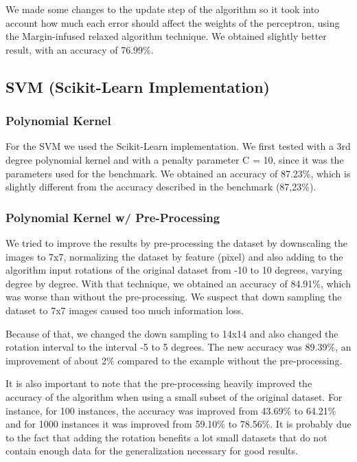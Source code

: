\documentclass[twoside,twocolumn]{article}
\begin{document}
We made some changes to the update step of the algorithm so it took into account how much
each error should affect the weights of the perceptron, using the Margin-infused relaxed algorithm
technique. We obtained slightly better result, with an accuracy of 76.99\%.

\subsection{SVM (Scikit-Learn Implementation)}

\subsubsection{Polynomial Kernel}

For the SVM we used the Scikit-Learn implementation. We first tested with a 3rd degree polynomial kernel and with a penalty parameter C = 10, since
it was the parameters used for the benchmark. We obtained an accuracy of 87.23\%, which is slightly different from the accuracy described in the benchmark (87,23\%).

\subsubsection{Polynomial Kernel w/ Pre-Processing}

We tried to improve the results by pre-processing the dataset by downscaling the images to 7x7, normalizing the dataset by feature (pixel) and also adding
to the algorithm input rotations of the original dataset from -10 to 10 degrees, varying degree by degree.
With that technique, we obtained an accuracy of 84.91\%, which was worse than without the pre-processing. We suspect that down sampling the dataset
to 7x7 images caused too much information loss.

Because of that, we changed the down sampling to 14x14 and also changed the rotation interval to the interval -5 to 5 degrees.
The new accuracy was 89.39\%, an improvement of about 2\% compared to the example without the pre-processing.

It is also important to note that the pre-processing heavily improved the accuracy of the algorithm when using a small subset of the
original dataset. For instance, for 100 instances, the accuracy was improved from 43.69\% to 64.21\% and for 1000 instances it was
improved from 59.10\% to 78.56\%. It is probably due to the fact that adding the rotation benefits a lot small datasets that do not contain
enough data for the generalization necessary for good results.
\end{document}

